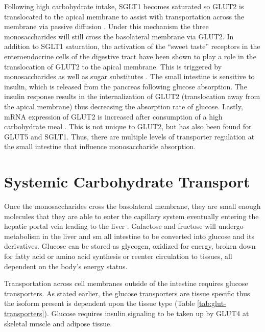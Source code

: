 \documentclass{tufte-handout}
\begin{document}
 Following high carbohydrate intake, SGLT1 becomes saturated so GLUT2 is translocated to the apical membrane to assist with transportation across the membrane via passive diffusion \citep{Kellett2008}. Under this mechanism the three monosaccharides will still cross the basolateral membrane via GLUT2. In addition to SGLT1 saturation, the activation of the ``sweet taste'' receptors in the enteroendocrine cells of the digestive tract have been shown to play a role in the translocation of GLUT2 to the apical membrane. This is triggered by monosaccharides as well as sugar substitutes \citep{Stearns2010}. The small intestine is sensitive to insulin, which is released from the pancreas following glucose absorption. The insulin response results in the internalization of GLUT2 (translocation away from the apical membrane) thus decreasing the absorption rate of glucose. Lastly, mRNA expression of GLUT2 is increased after consumption of a high carbohydrate meal \citep{Miyamoto1993}. This is not unique to GLUT2, but has also been found for GLUT5 and SGLT1. Thus, there are multiple levels of transporter regulation at the small intestine that influence monosaccharide absorption.


\section{Systemic Carbohydrate Transport}

Once the monosaccharides cross the basolateral membrane, they are small enough molecules that they are able to enter the capillary system eventually entering the hepatic portal vein leading to the liver . Galactose and fructose will undergo metabolism in the liver and sm all intestine to be converted into glucose and its derivatives. Glucose can be stored as glycogen, oxidized for energy, broken down for fatty acid or amino acid synthesis or reenter circulation to tissues, all dependent on the body's energy status.

Transportation across cell membranes outside of the intestine requires glucose transporters. As stated earlier, the glucose transporters are
tissue specific thus the isoform present is dependent upon the tissue type (Table \ref{tab:glut-transporters}). Glucose requires insulin signaling to be taken up by GLUT4 at skeletal muscle and adipose tissue.
\end{document}

